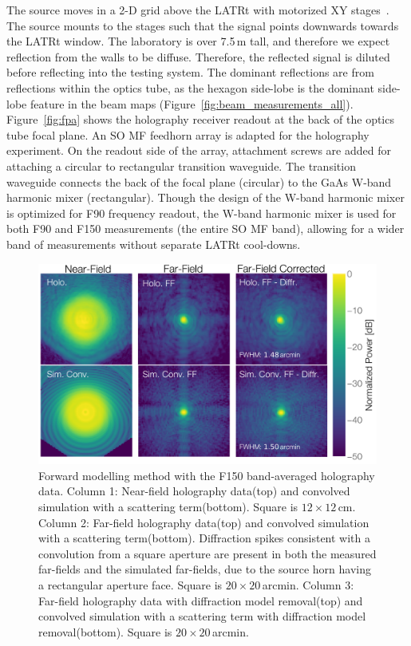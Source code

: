 The source moves in a 2-D grid above the LATRt with motorized XY stages~\cite{stages}.  The source mounts to the stages such that the signal points downwards towards the LATRt window.  The laboratory is over 7.5\,m tall, and therefore we expect reflection from the walls to be diffuse.  Therefore, the reflected signal is diluted before reflecting into the testing system.  The dominant reflections are from reflections within the optics tube, as the hexagon side-lobe is the dominant side-lobe feature in the beam maps (Figure~\ref{fig:beam_measurements_all}).
Figure~\ref{fig:fpa} shows the holography receiver readout at the back of the optics tube focal plane.  An SO MF feedhorn array is adapted for the holography experiment.  On the readout side of the array, attachment screws are added for attaching a circular to rectangular transition waveguide.  The transition waveguide connects the back of the focal plane (circular) to the GaAs W-band harmonic mixer (rectangular).  Though the design of the W-band harmonic mixer is optimized for F90 frequency readout, the W-band harmonic mixer is used for both F90 and F150 measurements (the entire SO MF band), allowing for a wider band of measurements without separate LATRt cool-downs.
\begin{figure}[t!]
    \centering
    \includegraphics[width = \textwidth]{Figures/forward_convolve_highres.pdf}
    \caption{Forward modelling method with the F150 band-averaged holography data. Column 1:  Near-field holography data(top) and convolved simulation with a scattering term(bottom).  Square is $12\times12\,$cm.  Column 2: Far-field holography data(top) and convolved simulation with a scattering term(bottom).  Diffraction spikes consistent with a convolution from a square aperture are present in both the measured far-fields and the simulated far-fields, due to the source horn having a rectangular aperture face.  Square is $20\times20\,$arcmin.  Column 3:  Far-field holography data with diffraction model removal(top) and convolved simulation with a scattering term with diffraction model removal(bottom). Square is $20\times20\,$arcmin.}
    \label{fig:forward_model}
\end{figure}
